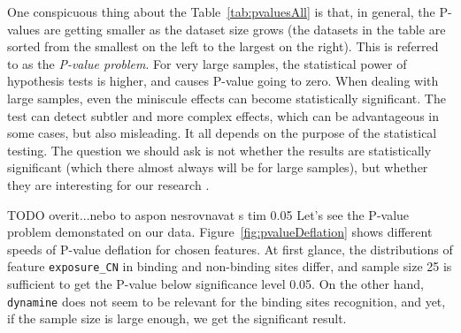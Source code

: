 One conspicuous thing about the Table~\ref{tab:pvaluesAll} is that, in general, the P-values are getting smaller as the dataset size grows (the datasets in the table are sorted from the smallest on the left to the largest on the right). This is referred to as the \textit{P-value problem}. For very large samples, the statistical power of hypothesis tests is higher, and causes P-value going to zero. When dealing with large samples, even the miniscule effects can become statistically significant. The test can detect subtler and more complex effects, which can be advantageous in some cases, but also misleading. It all depends on the purpose of the statistical testing. The question we should ask is not whether the results are statistically significant (which there almost always will be for large samples), but whether they are interesting for our research \cite{pvalueproblem}.

TODO overit...nebo to aspon nesrovnavat s tim 0.05
Let's see the P-value problem demonstated on our data. Figure~\ref{fig:pvalueDeflation} shows different speeds of P-value deflation for chosen features. At first glance, the distributions of feature \texttt{exposure\_CN} in binding and non-binding sites differ, and sample size 25 is sufficient to get the P-value below significance level 0.05. On the other hand, \texttt{dynamine} does not seem to be relevant for the binding sites recognition, and yet, if the sample size is large enough, we get the significant result.

